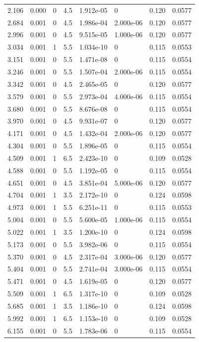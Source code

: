 \documentclass[preview]{standalone}
\begin{document}
{{\begin{tabular}{L{1.2cm}C{1.2cm} C{0.3cm}C{0.5cm} C{1.4cm}C{1.4cm} C{1.4cm}C{1.4cm}}
  2.106  &  0.000  & 0     & 4.5 &  1.912e-05  & 0  & 0.120 &  0.0577   \\ 
  2.684  &  0.001  & 0     & 4.5 &  1.986e-04  & 2.000e-06  & 0.120 &  0.0577   \\ 
  2.996  &  0.001  & 0     & 4.5 &  9.515e-05  & 1.000e-06  & 0.120 &  0.0577   \\ 
  3.034  &  0.001  & 1     & 5.5 &  1.034e-10  & 0  & 0.115 &  0.0553   \\ 
  3.151  &  0.001  & 0     & 5.5 &  1.471e-08  & 0  & 0.115 &  0.0554   \\ 
  3.246  &  0.001  & 0     & 5.5 &  1.507e-04  & 2.000e-06  & 0.115 &  0.0554   \\ 
  3.342  &  0.001  & 0     & 4.5 &  2.465e-05  & 0  & 0.120 &  0.0577   \\ 
  3.579  &  0.001  & 0     & 5.5 &  2.973e-04  & 4.000e-06  & 0.115 &  0.0554   \\ 
  3.680  &  0.001  & 0     & 5.5 &  8.676e-08  & 0  & 0.115 &  0.0554   \\ 
  3.970  &  0.001  & 0     & 4.5 &  9.931e-07  & 0  & 0.120 &  0.0577   \\ 
  4.171  &  0.001  & 0     & 4.5 &  1.432e-04  & 2.000e-06  & 0.120 &  0.0577   \\ 
  4.304  &  0.001  & 0     & 5.5 &  1.896e-05  & 0  & 0.115 &  0.0554   \\ 
  4.509  &  0.001  & 1     & 6.5 &  2.423e-10  & 0  & 0.109 &  0.0528   \\ 
  4.588  &  0.001  & 0     & 5.5 &  1.192e-05  & 0  & 0.115 &  0.0554   \\ 
  4.651  &  0.001  & 0     & 4.5 &  3.851e-04  & 5.000e-06  & 0.120 &  0.0577   \\ 
  4.704  &  0.001  & 1     & 3.5 &  2.172e-10  & 0  & 0.124 &  0.0598   \\ 
  4.973  &  0.001  & 1     & 5.5 &  6.251e-11  & 0  & 0.115 &  0.0553   \\ 
  5.004  &  0.001  & 0     & 5.5 &  5.600e-05  & 1.000e-06  & 0.115 &  0.0554   \\ 
  5.022  &  0.001  & 1     & 3.5 &  1.200e-10  & 0  & 0.124 &  0.0598   \\ 
  5.173  &  0.001  & 0     & 5.5 &  3.982e-06  & 0  & 0.115 &  0.0554   \\ 
  5.370  &  0.001  & 0     & 4.5 &  2.317e-04  & 3.000e-06  & 0.120 &  0.0577   \\ 
  5.404  &  0.001  & 0     & 5.5 &  2.741e-04  & 3.000e-06  & 0.115 &  0.0554   \\ 
  5.471  &  0.001  & 0     & 4.5 &  1.619e-05  & 0  & 0.120 &  0.0577   \\ 
  5.509  &  0.001  & 1     & 6.5 &  1.317e-10  & 0  & 0.109 &  0.0528   \\ 
  5.685  &  0.001  & 1     & 3.5 &  1.186e-10  & 0  & 0.124 &  0.0598   \\ 
  5.992  &  0.001  & 1     & 6.5 &  1.153e-10  & 0  & 0.109 &  0.0528   \\ 
  6.155  &  0.001  & 0     & 5.5 &  1.783e-06  & 0  & 0.115 &  0.0554   \\ 
\hline 
\end{tabular} 

}}
\end{document}
